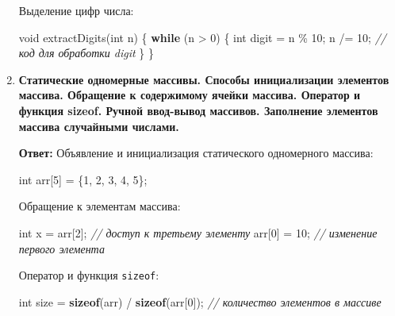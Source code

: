 \documentclass[
]{article}
\newenvironment{Shaded}{}{}
\newcommand{\CommentTok}[1]{\textcolor[rgb]{0.38,0.63,0.69}{\textit{#1}}}
\newcommand{\ControlFlowTok}[1]{\textcolor[rgb]{0.00,0.44,0.13}{\textbf{#1}}}
\newcommand{\DataTypeTok}[1]{\textcolor[rgb]{0.56,0.13,0.00}{#1}}
\newcommand{\DecValTok}[1]{\textcolor[rgb]{0.25,0.63,0.44}{#1}}
\newcommand{\KeywordTok}[1]{\textcolor[rgb]{0.00,0.44,0.13}{\textbf{#1}}}
\newcommand{\NormalTok}[1]{#1}
\newcommand{\OperatorTok}[1]{\textcolor[rgb]{0.40,0.40,0.40}{#1}}
\begin{document}
\begin{enumerate}
  Выделение цифр числа:

\begin{Shaded}
\begin{Highlighting}[]
\DataTypeTok{void}\NormalTok{ extractDigits}\OperatorTok{(}\DataTypeTok{int}\NormalTok{ n}\OperatorTok{)} \OperatorTok{\{}
    \ControlFlowTok{while} \OperatorTok{(}\NormalTok{n }\OperatorTok{\textgreater{}} \DecValTok{0}\OperatorTok{)} \OperatorTok{\{}
        \DataTypeTok{int}\NormalTok{ digit }\OperatorTok{=}\NormalTok{ n }\OperatorTok{\%} \DecValTok{10}\OperatorTok{;}
\NormalTok{        n }\OperatorTok{/=} \DecValTok{10}\OperatorTok{;}
        \CommentTok{// код для обработки digit}
    \OperatorTok{\}}
\OperatorTok{\}}
\end{Highlighting}
\end{Shaded}
\item
  \textbf{Статические одномерные массивы. Способы инициализации
  элементов массива. Обращение к содержимому ячейки массива. Оператор и
  функция sizeof. Ручной ввод-вывод массивов. Заполнение элементов
  массива случайными числами.}

  \textbf{Ответ:} Объявление и инициализация статического одномерного
  массива:

\begin{Shaded}
\begin{Highlighting}[]
\DataTypeTok{int}\NormalTok{ arr}\OperatorTok{[}\DecValTok{5}\OperatorTok{]} \OperatorTok{=} \OperatorTok{\{}\DecValTok{1}\OperatorTok{,} \DecValTok{2}\OperatorTok{,} \DecValTok{3}\OperatorTok{,} \DecValTok{4}\OperatorTok{,} \DecValTok{5}\OperatorTok{\};}
\end{Highlighting}
\end{Shaded}

  Обращение к элементам массива:

\begin{Shaded}
\begin{Highlighting}[]
\DataTypeTok{int}\NormalTok{ x }\OperatorTok{=}\NormalTok{ arr}\OperatorTok{[}\DecValTok{2}\OperatorTok{];} \CommentTok{// доступ к третьему элементу}
\NormalTok{arr}\OperatorTok{[}\DecValTok{0}\OperatorTok{]} \OperatorTok{=} \DecValTok{10}\OperatorTok{;} \CommentTok{// изменение первого элемента}
\end{Highlighting}
\end{Shaded}

  Оператор и функция \texttt{sizeof}:

\begin{Shaded}
\begin{Highlighting}[]
\DataTypeTok{int}\NormalTok{ size }\OperatorTok{=} \KeywordTok{sizeof}\OperatorTok{(}\NormalTok{arr}\OperatorTok{)} \OperatorTok{/} \KeywordTok{sizeof}\OperatorTok{(}\NormalTok{arr}\OperatorTok{[}\DecValTok{0}\OperatorTok{]);} \CommentTok{// количество элементов в массиве}
\end{Highlighting}
\end{Shaded}


\end{enumerate}
\end{document}
